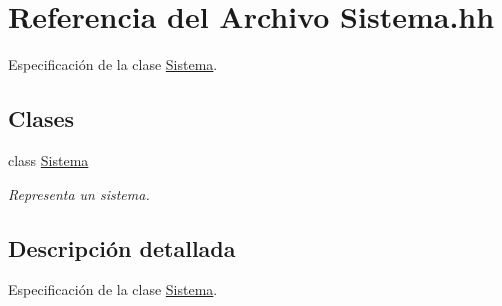 \hypertarget{_sistema_8hh}{}\section{Referencia del Archivo Sistema.\+hh}
\label{_sistema_8hh}


Especificación de la clase \hyperlink{class_sistema}{Sistema}.  


\subsection*{Clases}
\begin{DoxyCompactItemize}
\item 
class \hyperlink{class_sistema}{Sistema}
\begin{DoxyCompactList}\small\item\em Representa un sistema. \end{DoxyCompactList}\end{DoxyCompactItemize}


\subsection{Descripción detallada}
Especificación de la clase \hyperlink{class_sistema}{Sistema}. 

